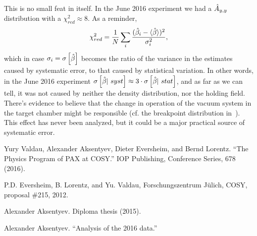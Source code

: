 \documentclass{article}
\begin{document}
This is no small feat in itself. In the June 2016 experiment we had a $\Ayy*$ distribution with a $\chi^2_{red} \approx 8$. As a reminder, 
\begin{equation}
	\chi^2_{red} = \frac{1}{N}\sum_i \frac{(\slp*[i] - \avg{\slp*})^2}{\sigma_i^2},
\end{equation}
which in case $\sigma_i = \SE{\slp*}$ becomes the ratio of the variance in the estimates caused by systematic error, to that caused by statistical variation. In other words, in the June 2016 experiment $\SE{\slp*|~syst} \approx 3\cdot \SE{\slp*|~stat}$, and as far as we can tell, it was not caused by neither the density distribution, nor the holding field. There's evidence to believe that the change in operation of the vacuum system in the target chamber might be responsible (cf. the breakpoint distribution in~\cite{DAnaRep}). This effect has never been analyzed, but it could be a major practical source of systematic error.


\begin{thebibliography}{9}
	Yury Valdau, Alexander Aksentyev, Dieter Eversheim, and Bernd Lorentz. ``The Physics Program of PAX at COSY.'' IOP Publishing, Conference Series, 678 (2016).
	
	
		
	P.D. Eversheim, B. Lorentz, and Yu. Valdau, Forschungszentrum J\"ulich, COSY, proposal \#215, 2012.
	
	Alexander Aksentyev. Diploma thesis (2015).
	
	Alexander Aksentyev. ``Analysis of the 2016 data.''
\end{thebibliography}
\end{document}
